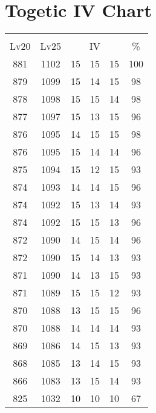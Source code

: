 \documentclass{article}%
\begin{document}
%
\normalsize%
\section{Togetic IV Chart}%
\label{sec:Togetic IV Chart}%
\renewcommand{\arraystretch}{1.5}%
\begin{tabular}{|c|c|c|c|c|c|}%
\hline%
\multicolumn{6}{|c|}{\textcolor{white}{ 
\linebreak{Togetic}
}%
\cellcolor{black}}\\%
\multicolumn{1}{|c}{Lv20}&\multicolumn{1}{c|}{Lv25}&\multicolumn{3}{c|}{IV}&\multicolumn{1}{|c|}{\%}\\%
\hline%
\rowcolor{color100}%
881&1102&15&15&15&100\\%
\hline%
\rowcolor{color98}%
879&1099&15&14&15&98\\%
\hline%
\rowcolor{color98}%
878&1098&15&15&14&98\\%
\hline%
\rowcolor{color96}%
877&1097&15&13&15&96\\%
\hline%
\rowcolor{color98}%
876&1095&14&15&15&98\\%
\hline%
\rowcolor{color96}%
876&1095&15&14&14&96\\%
\hline%
\rowcolor{color93}%
875&1094&15&12&15&93\\%
\hline%
\rowcolor{color96}%
874&1093&14&14&15&96\\%
\hline%
\rowcolor{color93}%
874&1092&15&13&14&93\\%
\hline%
\rowcolor{color96}%
874&1092&15&15&13&96\\%
\hline%
\rowcolor{color96}%
872&1090&14&15&14&96\\%
\hline%
\rowcolor{color93}%
872&1090&15&14&13&93\\%
\hline%
\rowcolor{color93}%
871&1090&14&13&15&93\\%
\hline%
\rowcolor{color93}%
871&1089&15&15&12&93\\%
\hline%
\rowcolor{color96}%
870&1088&13&15&15&96\\%
\hline%
\rowcolor{color93}%
870&1088&14&14&14&93\\%
\hline%
\rowcolor{color93}%
869&1086&14&15&13&93\\%
\hline%
\rowcolor{color93}%
868&1085&13&14&15&93\\%
\hline%
\rowcolor{color93}%
866&1083&13&15&14&93\\%
\hline%
\rowcolor{color91}%
825&1032&10&10&10&67\\%
\end{tabular}

%
\end{document}
